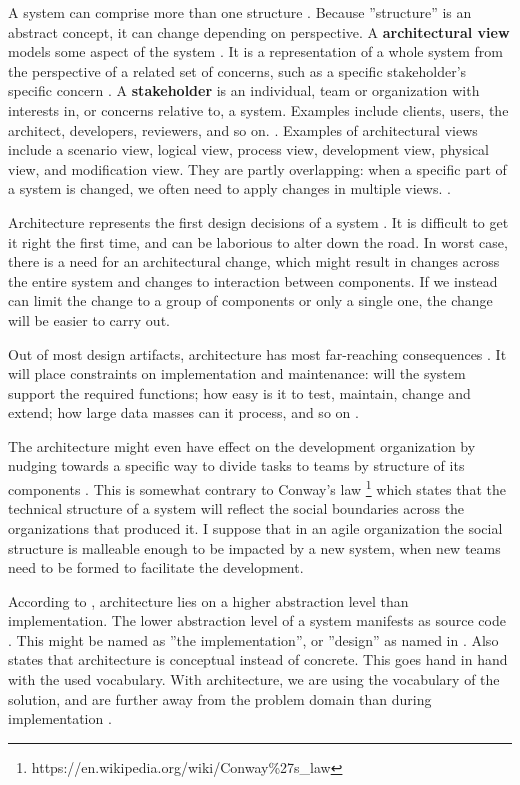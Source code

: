 \documentclass[utf8,english]{gradu3}
\begin{document}
A system can comprise more than one structure \parencite[23]{Bass1998}. Because
''structure'' is an abstract concept, it can change depending on perspective. A
\textbf{architectural view} models some aspect of the system
\parencite{Koskimies2005}. It is a representation of a whole system from the
perspective of a related set of concerns, such as a specific stakeholder's
specific concern \parencite[3]{IEEE42010}. A \textbf{stakeholder} is an
individual, team or organization with interests in, or concerns relative to, a
system. Examples include clients, users, the architect, developers, reviewers,
and so on. \parencite[3]{IEEE42010}. Examples of architectural views include a
scenario view, logical view, process view, development view, physical view, and
modification view. They are partly overlapping: when a specific part of a system
is changed, we often need to apply changes in multiple views.
\parencite{Koskimies2005}.

Architecture represents the first design decisions of a system
\parencite{Bass1998}. It is difficult to get it right the first time, and can be
laborious to alter down the road. In worst case, there is a need for an
architectural change, which might result in changes across the entire system and
changes to interaction between components. If we instead can limit the change to
a group of components or only a single one, the change will be easier to carry
out. \parencite[31]{Bass1998}

Out of most design artifacts, architecture has most far-reaching consequences
\parencite[31]{Bass1998}. It will place constraints on implementation and
maintenance: will the system support the required functions; how easy is it to
test, maintain, change and extend; how large data masses can it process, and so
on \parencite{Koskimies2005}.

The architecture might even have effect on the development organization by
nudging towards a specific way to divide tasks to teams by structure of its
components \parencite[31]{Bass1998}. This is somewhat contrary to Conway's law
\footnote{https://en.wikipedia.org/wiki/Conway\%27s\_law} which states that the
technical structure of a system will reflect the social boundaries across the
organizations that produced it. I suppose that in an agile organization the
social structure is malleable enough to be impacted by a new system, when new
teams need to be formed to facilitate the development.

According to \textcite{Koskimies2005}, architecture lies on a higher abstraction
level than implementation. The lower abstraction level of a system manifests as
source code \parencite[24]{Bass1998}. This might be named as ''the
implementation'', or ''design'' as named in \textcite{IEEE12207}. Also
\textcite[4]{IEEE42010} states that architecture is conceptual instead of
concrete. This goes hand in hand with the used vocabulary. With architecture, we
are using the vocabulary of the solution, and are further away from the problem
domain than during implementation \parencite{Koskimies2005}.
\end{document}
